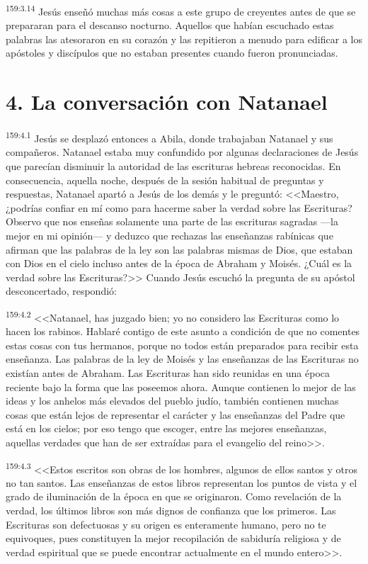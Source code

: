 \par 
\textsuperscript{159:3.14} Jesús enseñó muchas más cosas a este grupo de creyentes antes de que se prepararan para el descanso nocturno. Aquellos que habían escuchado estas palabras las atesoraron en su corazón y las repitieron a menudo para edificar a los apóstoles y discípulos que no estaban presentes cuando fueron pronunciadas.

\section*{4. La conversación con Natanael}
\par 
\textsuperscript{159:4.1} Jesús se desplazó entonces a Abila, donde trabajaban Natanael y sus compañeros. Natanael estaba muy confundido por algunas declaraciones de Jesús que parecían disminuir la autoridad de las escrituras hebreas reconocidas. En consecuencia, aquella noche, después de la sesión habitual de preguntas y respuestas, Natanael apartó a Jesús de los demás y le preguntó: <<Maestro, ¿podrías confiar en mí como para hacerme saber la verdad sobre las Escrituras? Observo que nos enseñas solamente una parte de las escrituras sagradas ---la mejor en mi opinión--- y deduzco que rechazas las enseñanzas rabínicas que afirman que las palabras de la ley son las palabras mismas de Dios, que estaban con Dios en el cielo incluso antes de la época de Abraham y Moisés. ¿Cuál es la verdad sobre las Escrituras?>> Cuando Jesús escuchó la pregunta de su apóstol desconcertado, respondió:

\par 
\textsuperscript{159:4.2} <<Natanael, has juzgado bien; yo no considero las Escrituras como lo hacen los rabinos. Hablaré contigo de este asunto a condición de que no comentes estas cosas con tus hermanos, porque no todos están preparados para recibir esta enseñanza. Las palabras de la ley de Moisés y las enseñanzas de las Escrituras no existían antes de Abraham. Las Escrituras han sido reunidas en una época reciente bajo la forma que las poseemos ahora. Aunque contienen lo mejor de las ideas y los anhelos más elevados del pueblo judío, también contienen muchas cosas que están lejos de representar el carácter y las enseñanzas del Padre que está en los cielos; por eso tengo que escoger, entre las mejores enseñanzas, aquellas verdades que han de ser extraídas para el evangelio del reino>>.

\par 
\textsuperscript{159:4.3} <<Estos escritos son obras de los hombres, algunos de ellos santos y otros no tan santos. Las enseñanzas de estos libros representan los puntos de vista y el grado de iluminación de la época en que se originaron. Como revelación de la verdad, los últimos libros son más dignos de confianza que los primeros. Las Escrituras son defectuosas y su origen es enteramente humano, pero no te equivoques, pues constituyen la mejor recopilación de sabiduría religiosa y de verdad espiritual que se puede encontrar actualmente en el mundo entero>>.

